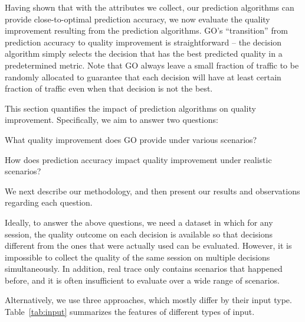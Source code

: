 \label{improvement}

Having shown that with the attributes we collect, our prediction algorithms can provide close-to-optimal prediction accuracy, we now evaluate the quality improvement resulting from the prediction algorithms. GO's ``transition'' from prediction accuracy to quality improvement is straightforward -- the decision algorithm simply selects the decision that has the best predicted quality in a predetermined metric. Note that GO always leave a small fraction of traffic to be randomly allocated to guarantee that each decision will have at least certain fraction of traffic even when that decision is not the best.

This section quantifies the impact of prediction algorithms on quality improvement. Specifically, we aim to answer two questions:
\begin{packedenumerate}
	\item What quality improvement does GO provide under various scenarios?
	\item How does prediction accuracy impact quality improvement under realistic scenarios?
\end{packedenumerate}

We next describe our methodology, and then present our results and observations regarding each question.


Ideally, to answer the above questions, we need a dataset in which for any session, the quality outcome on each decision is available so that decisions different from the ones that were actually used can be evaluated. However, it is impossible to collect the quality of the same session on multiple decisions simultaneously. In addition, real trace only contains scenarios that happened before, and it is often insufficient to evaluate over a wide range of scenarios.

Alternatively, we use three approaches, which mostly differ by their input type. Table~\ref{tab:input} summarizes the features of different types of input. 

